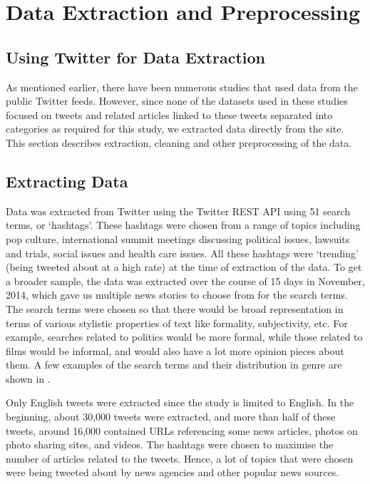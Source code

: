 \section{Data Extraction and Preprocessing}

\subsection{Using Twitter for Data Extraction}

As mentioned earlier, there have been numerous studies that used data from the public Twitter feeds. However, since none of the datasets used in these studies focused on tweets and related articles linked to these tweets separated into categories as required for this study, we extracted data directly from the site. This section describes extraction, cleaning and other preprocessing of the data.

\subsection{Extracting Data}

Data was extracted from Twitter using the Twitter REST API using 51 search terms, or ‘hashtags’. These hashtags were chosen from a range of topics including pop culture,  international summit meetings discussing political issues, lawsuits and trials, social issues and health care issues. All these hashtags were ‘trending’ (being tweeted about at a high rate) at the time of extraction of the data. To get a broader sample, the data was extracted over the course of 15 days in November, 2014, which gave us multiple news stories to choose from for the search terms. The search terms were chosen so that there would be broad representation in terms of various stylistic properties of text like formality, subjectivity, etc. For example, searches related to politics would be more formal, while those related to films would be informal, and would also have a lot more opinion pieces about them. A few examples of the search terms and their distribution in genre are shown in .

Only English tweets were extracted since the study is limited to English. In the beginning, about 30,000 tweets were extracted, and more than half of these tweets, around 16,000 contained URLs referencing some news articles, photos on photo sharing sites, and videos. The hashtags were chosen to maximise the number of articles related to the tweets. Hence, a lot of topics that were chosen were being tweeted about by news agencies and other popular news sources.

